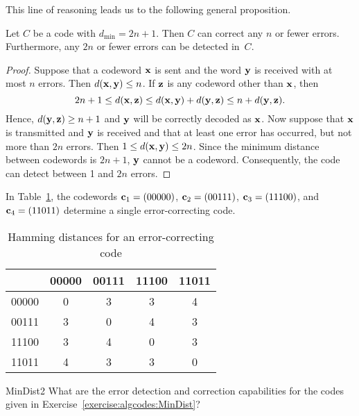  This line of reasoning leads us to the following general proposition.
 
\begin{prop}{}
Let $C$ be a code with $d_{\min} = 2n + 1$. Then $C$ can correct any
$n$ or fewer errors.  Furthermore, any $2n$ or fewer errors can be
detected in~$C$. 
\end{prop}
  
\begin{proof}
Suppose that a codeword ${\bold x}$ is sent and the word ${\bold y}$
is received with at most $n$ errors. Then $d( {\bold x}, {\bold y})
\leq n$. If ${\bold z}$ is any codeword other than ${\bold x}$, then
\[
2n+1
\leq
d( {\bold x}, {\bold z})
\leq
d( {\bold x}, {\bold y}) + d( {\bold y}, {\bold z})
\leq
n + d( {\bold y}, {\bold z}).
\]
Hence, $d({\bold y}, {\bold z} ) \geq n+1$ and ${\bold y}$ will be
correctly decoded as ${\bold x}$. Now suppose that ${\bold x}$ is
transmitted and ${\bold y}$ is received and that at least one error 
has occurred, but not more than $2n$ errors. Then $1 \leq d( {\bold x},
{\bold y} ) \leq 2n$.  Since the minimum distance between codewords is
$2n +1$, ${\bold y}$ cannot be a codeword.  Consequently, the code can
detect between 1 and $2n$ errors. 
\end{proof}
 
 \begin{example}{}
In Table~\ref{algcodes:table2}, the codewords ${\bold c}_1 = (00000)$, ${\bold c}_2 = (00111)$,
${\bold c}_3 = (11100)$, and ${\bold c}_4 = (11011)$ determine a
single error-correcting code.  
\end{example}
  
\begin{table}[htb]
\caption{ Hamming distances for an error-correcting code\label{algcodes:table2}}{\small
\begin{center}
\begin{tabular}{|c|cccc|}
\hline
      & 00000 & 00111 & 11100 & 11011 \\ \hline
00000 & 0     & 3     & 3     & 4 \\
00111 & 3     & 0     & 4     & 3 \\
11100 & 3     & 4     & 0     & 3 \\
11011 & 4     & 3     & 3     & 0 \\
\hline
\end{tabular}
\end{center}
}
\end{table}
 
 \begin{exercise}{MinDist2}
What are the error detection and correction capabilities for the codes given in Exercise~\ref{exercise:algcodes:MinDist}? 
\end{exercise} 
 
